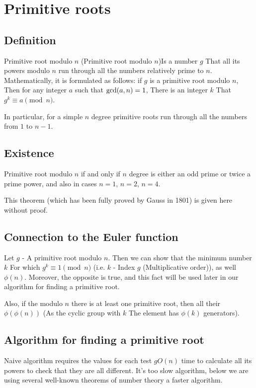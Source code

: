 \section{ Primitive roots }
\subsection{ Definition }

Primitive root modulo $n$ (Primitive root modulo $n$)Is a number $g$ That all its powers modulo $n$ run through all the numbers relatively prime to $n$. Mathematically, it is formulated as follows: if $g$ is a primitive root modulo $n$, Then for any integer $a$ such that ${\rm gcd} (a, n) = 1$, There is an integer $k$ That $g ^ k \equiv a \pmod {n}$.

In particular, for a simple $n$ degree primitive roots run through all the numbers from $1$ to $n-1$.

\subsection{ Existence }

Primitive root modulo $n$ if and only if $n$ degree is either an odd prime or twice a prime power, and also in cases $n = 1$, $n = 2$, $n = 4$.

This theorem (which has been fully proved by Gauss in 1801) is given here without proof.

\subsection{ Connection to the Euler function }

Let $g$ - A primitive root modulo $n$. Then we can show that the minimum number $k$ For which $g ^ k \equiv 1 \pmod {n}$ (i.e. $k$ - Index $g$ (Multiplicative order)), as well $\phi (n)$. Moreover, the opposite is true, and this fact will be used later in our algorithm for finding a primitive root.

Also, if the modulo $n$ there is at least one primitive root, then all their $\phi (\phi (n))$ (As the cyclic group with $k$ The element has $\phi (k)$ generators).

\subsection{ Algorithm for finding a primitive root }

Naive algorithm requires the values ​​for each test $g$$O (n)$ time to calculate all its powers to check that they are all different. It's too slow algorithm, below we are using several well-known theorems of number theory a faster algorithm.


